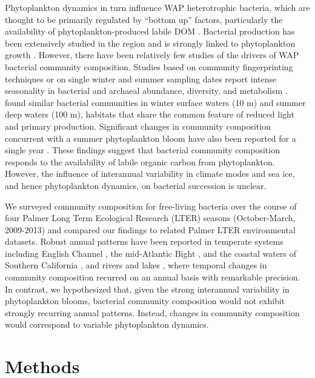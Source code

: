 Phytoplankton dynamics in turn influence WAP heterotrophic bacteria, which are thought to be primarily regulated by ``bottom up'' factors, particularly the availability of phytoplankton-produced labile DOM \citep{dsvse12,Kirchman2009-sg}. Bacterial production has been extensively studied in the region and is strongly linked to phytoplankton growth \citep{kim2016decedal,luria2016seasonal,dsvse12,Moran2001-ot}. However, there have been relatively few studies of the drivers of WAP bacterial community composition. Studies based on community fingerprinting techniques or on single winter and summer sampling dates report intense seasonality in bacterial and archaeal abundance, diversity, and metabolism \citep{Luria2014-dj,grwddecm12,mpmtbwd98,mg07}. \citet{Luria2014-dj} found similar bacterial communities in winter surface waters (10 m) and summer deep waters (100 m), habitats that share the common feature of reduced light and primary production. Significant changes in community composition concurrent with a summer phytoplankton bloom have also been reported for a single year \citep{luria2016seasonal}. These findings suggest that bacterial community composition responds to the availability of labile organic carbon from phytoplankton. However, the influence of interannual variability in climate modes and sea ice, and hence phytoplankton dynamics, on bacterial succession is unclear.

We surveyed community composition for free-living bacteria over the course of four Palmer Long Term Ecological Research (LTER) seasons (October-March, 2009-2013) and compared our findings to related Palmer LTER environmental datasets. Robust annual patterns have been reported in temperate systems including English Channel \citep{Gilbert2012-ta}, the mid-Atlantic Bight \citep{Nelson2008-fn}, and the coastal waters of Southern California \citep{chow2013temporal,fuhrman2006annually}, and rivers and lakes \citep{Crump2005-kv,Eiler2012-yh}, where temporal changes in community composition recurred on an annual basis with remarkable precision. In contrast, we hypothesized that, given the strong interannual variability in phytoplankton blooms, bacterial community composition would not exhibit strongly recurring annual patterns. Instead, changes in community composition would correspond to variable phytoplankton dynamics. 

\section{Methods}

